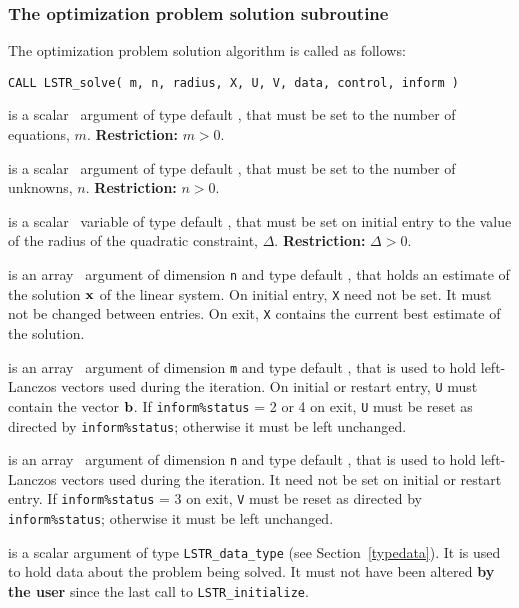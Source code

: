 \documentclass{galahad}
\newcommand{\packagename}{LS\-TR}
\begin{document}

\subsubsection{The optimization problem solution subroutine}
The optimization problem solution algorithm is called as follows:

\hskip0.5in
{\tt CALL \packagename\_solve( m, n, radius, X, U, V, data, control, inform )}

\begin{description}

 is a scalar \intentin\ argument of type default \integer, that must be
set to the number of equations, $m$. {\bf Restriction: } $m > 0$.

 is a scalar \intentin\ argument of type default \integer, that must be
set to the number of unknowns, $n$. {\bf Restriction: } $n > 0$.

 is a scalar \intentin\ variable of type default
\realdp,
that must be set on initial entry
to the value of the radius of the quadratic constraint, $\Delta$.
{\bf Restriction: } $\Delta > 0$.

 is an array \intentinout\ argument of dimension {\tt n} and
type default \realdp,
that holds an estimate of the solution ${\mathbf{x}}$ of the linear system.
On initial entry, {\tt X} need not be set.
It must not be changed between entries.
On exit, {\tt X} contains the current best estimate of the solution.

 is an array \intentinout\ argument of dimension {\tt m} and
type default \realdp,
that is used to hold left-Lanczos vectors used during the iteration.
On initial or restart entry, {\tt U} must contain the vector ${\mathbf{b}}$.
If {\tt inform\%status} = 2 or 4 on exit, {\tt U} must be reset
as directed by  {\tt inform\%status}; otherwise
it must be left unchanged.

 is an array \intentinout\ argument of dimension {\tt n} and
type default \realdp,
that is used to hold left-Lanczos vectors used during the iteration.
It need not be set on initial or restart entry.
If {\tt inform\%status} = 3 on exit, {\tt V} must be reset
as directed by  {\tt inform\%status}; otherwise it must be left unchanged.

 is a scalar \intentinout argument of type
{\tt \packagename\_data\_type}
(see Section~\ref{typedata}). It is used to hold data about the problem being
solved. It must not have been altered {\bf by the user} since the last call to
{\tt \packagename\_initialize}.


\end{description}
\end{document}
